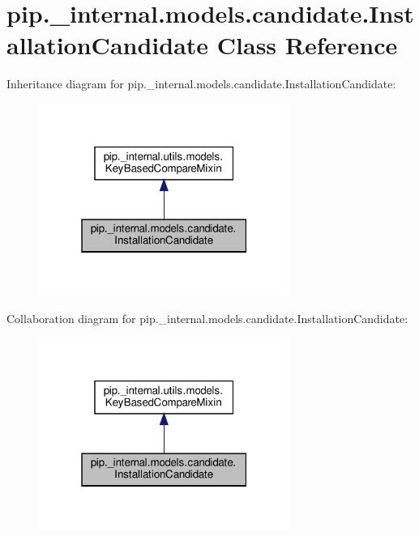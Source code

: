 \hypertarget{classpip_1_1__internal_1_1models_1_1candidate_1_1InstallationCandidate}{}\section{pip.\+\_\+internal.\+models.\+candidate.\+Installation\+Candidate Class Reference}
\label{classpip_1_1__internal_1_1models_1_1candidate_1_1InstallationCandidate}


Inheritance diagram for pip.\+\_\+internal.\+models.\+candidate.\+Installation\+Candidate\+:
\nopagebreak
\begin{figure}[H]
\begin{center}
\leavevmode
\includegraphics[width=232pt]{classpip_1_1__internal_1_1models_1_1candidate_1_1InstallationCandidate__inherit__graph}
\end{center}
\end{figure}


Collaboration diagram for pip.\+\_\+internal.\+models.\+candidate.\+Installation\+Candidate\+:
\nopagebreak
\begin{figure}[H]
\begin{center}
\leavevmode
\includegraphics[width=232pt]{classpip_1_1__internal_1_1models_1_1candidate_1_1InstallationCandidate__coll__graph}
\end{center}
\end{figure}
